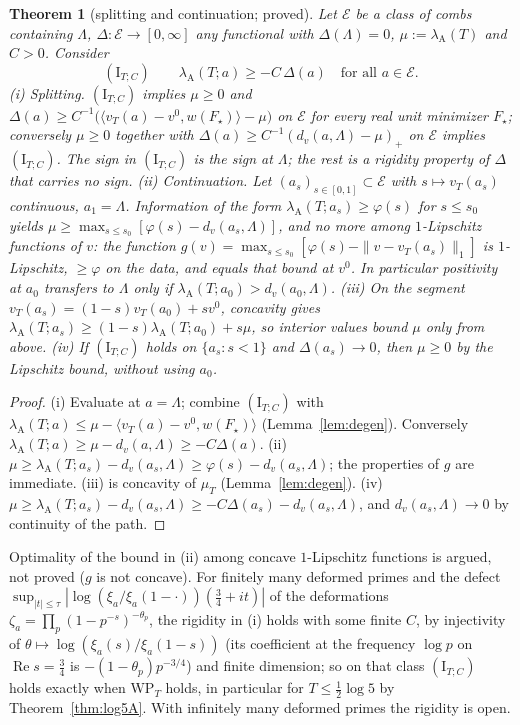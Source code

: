 \documentclass[11pt]{amsart}
\newtheorem{theorem}{Theorem}[section]
\theoremstyle{definition}
\theoremstyle{remark}
\newcommand{\Rel}{\operatorname{Re}}
\newcommand{\lamA}{\lambda_{\mathrm A}(T)}
\begin{document}
\begin{theorem}[splitting and continuation; proved]\label{thm:geo-split}
Let $\mathcal E$ be a class of combs containing $\Lambda$, $\Delta:\mathcal E\to[0,\infty]$ any functional with $\Delta(\Lambda)=0$,
$\mu:=\lamA$ and $C>0$. Consider
\[
(\mathrm I_{T;C})\qquad \lambda_{\mathrm A}(T;a)\ge-C\,\Delta(a)\quad\text{for all }a\in\mathcal E.
\]
\emph{(i) Splitting.} $(\mathrm I_{T;C})$ implies $\mu\ge0$ and $\Delta(a)\ge C^{-1}\big(\langle v_T(a)-v^0,w(F_\star)\rangle-\mu\big)$ on $\mathcal E$ for
every real unit minimizer $F_\star$; conversely $\mu\ge0$ together with $\Delta(a)\ge C^{-1}(d_v(a,\Lambda)-\mu)_+$ on $\mathcal E$ implies
$(\mathrm I_{T;C})$. The sign in $(\mathrm I_{T;C})$ is the sign at $\Lambda$; the rest is a rigidity property of $\Delta$ that carries no sign.
\emph{(ii) Continuation.} Let $(a_s)_{s\in[0,1]}\subset\mathcal E$ with $s\mapsto v_T(a_s)$ continuous, $a_1=\Lambda$. Information of the form
$\lambda_{\mathrm A}(T;a_s)\ge\varphi(s)$ for $s\le s_0$ yields $\mu\ge\max_{s\le s_0}[\varphi(s)-d_v(a_s,\Lambda)]$, and no more among
$1$-Lipschitz functions of $v$: the function $g(v)=\max_{s\le s_0}[\varphi(s)-\|v-v_T(a_s)\|_1]$ is $1$-Lipschitz, $\ge\varphi$ on the data,
and equals that bound at $v^0$. In particular positivity at $a_0$ transfers to $\Lambda$ only if $\lambda_{\mathrm A}(T;a_0)>d_v(a_0,\Lambda)$.
\emph{(iii)} On the segment $v_T(a_s)=(1-s)v_T(a_0)+sv^0$, concavity gives $\lambda_{\mathrm A}(T;a_s)\ge(1-s)\lambda_{\mathrm A}(T;a_0)+s\mu$, so interior
values bound $\mu$ only from above. \emph{(iv)} If $(\mathrm I_{T;C})$ holds on $\{a_s:s<1\}$ and $\Delta(a_s)\to0$, then $\mu\ge0$ by the Lipschitz
bound, without using $a_0$.
\end{theorem}
\begin{proof}
(i) Evaluate at $a=\Lambda$; combine $(\mathrm I_{T;C})$ with $\lambda_{\mathrm A}(T;a)\le\mu-\langle v_T(a)-v^0,w(F_\star)\rangle$ (Lemma~\ref{lem:degen}).
Conversely $\lambda_{\mathrm A}(T;a)\ge\mu-d_v(a,\Lambda)\ge-C\Delta(a)$. (ii) $\mu\ge\lambda_{\mathrm A}(T;a_s)-d_v(a_s,\Lambda)\ge\varphi(s)-d_v(a_s,\Lambda)$;
the properties of $g$ are immediate. (iii) is concavity of $\mu_T$ (Lemma~\ref{lem:degen}). (iv) $\mu\ge\lambda_{\mathrm A}(T;a_s)-d_v(a_s,\Lambda)\ge
-C\Delta(a_s)-d_v(a_s,\Lambda)$, and $d_v(a_s,\Lambda)\to0$ by continuity of the path.
\end{proof}

Optimality of the bound in (ii) among concave $1$-Lipschitz functions is argued, not proved ($g$ is not concave). For finitely many
deformed primes and the defect $\sup_{|t|\le\tau}|\log(\xi_a/\xi_a(1-\cdot))(\frac34+it)|$ of the deformations
$\zeta_a=\prod_p(1-p^{-s})^{-\theta_p}$, the rigidity in (i) holds with some finite $C$, by injectivity of $\theta\mapsto\log(\xi_a(s)/\xi_a(1-s))$
(its coefficient at the frequency $\log p$ on $\Rel s=\frac34$ is $-(1-\theta_p)p^{-3/4}$) and finite dimension; so on that class
$(\mathrm I_{T;C})$ holds exactly when $\mathrm{WP}_T$ holds, in particular for $T\le\frac12\log5$ by Theorem~\ref{thm:log5A}.
With infinitely many deformed primes the rigidity is open.
\end{document}
